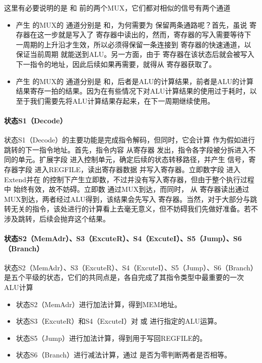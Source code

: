 这里有必要说明的是 和 前的两个MUX，它们都对相似的信号有两个通道
\begin{itemize}
    \item 产生 的MUX的 通道分别是 和，为何需要为 保留两条通路呢？首先，虽说 寄存器在这一步就是写入了 寄存器中读出的，然而，寄存器的写入需要等待下一周期的上升沿才生效，所以必须得保留一条连接到 寄存器的快速通道，以保证当前周期 就能送到ALU。另一方面，由于 寄存器在该状态后就会被写入下一指令的地址，因此后续如果再需要，就得从 寄存器获取了。
    \item 产生 的MUX的 通道分别是 和，后者是ALU的计算结果，前者是ALU的计算结果寄存一拍的结果。因为在有些情况下对ALU计算结果的使用过于耗时，以至于我们需要先将ALU计算结果存起来，在下一周期继续使用。
\end{itemize}

\paragraph{状态S1（Decode）}
状态S1（Decode）的主要功能是完成指令解码，但同时，它会计算 作为假如进行跳转的下一指令地址。首先，指令内容 从寄存器 发出，指令各字段被分拆进入不同的单元。扩展字段 进入控制单元，确定后续的状态转移路径，并产生 信号，寄存器字段 进入REGFILE，读出寄存器数据 并写入寄存器。立即数字段 进入Extend并在 的控制下产生立即数，不过并没有写入寄存器，但由于整个执行过程中 始终有效，故不妨碍。立即数 通过MUX到达，而同时， 从 寄存器读出通过MUX到达，两者经过ALU得到，该结果会先写入 寄存器。当然，对于大部分与跳转无关的指令，该处进行的计算看上去毫无意义，但不妨碍我们先做好准备。若不涉及跳转，后续会抛弃这个结果。

\paragraph{状态S2（MemAdr）、S3（ExcuteR）、S4（ExcuteI）、S5（Jump）、S6（Branch）}
状态S2（MemAdr）、S3（ExcuteR）、S4（ExcuteI）、S5（Jump）、S6（Branch）是五个平级的状态，它们的共同点是，各自完成了其指令类型中最重要的一次ALU计算

\begin{itemize}
    \item 状态S2（MemAdr）进行加法计算，得到MEM地址。
    \item 状态S3（ExcuteR）和S4（ExcuteI）对 或 进行指定的ALU运算。
    \item 状态S5（Jump）进行加法计算，得到用于写回REGFILE的。
    \item 状态S6（Branch）进行减法计算，通过 是否为零判断两者是否相等。
\end{itemize}

